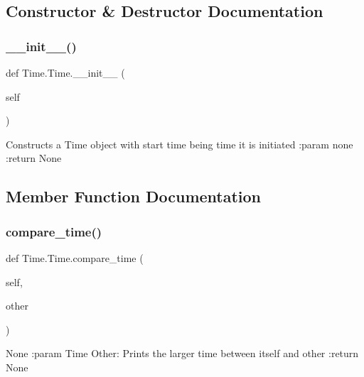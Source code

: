 \subsection{Constructor \& Destructor Documentation}
\mbox{\label{class_time_1_1_time_a2fcd7309de0e40d3550b6fd97c2551bc}} 
\subsubsection{\texorpdfstring{\+\_\+\+\_\+init\+\_\+\+\_\+()}{\_\_init\_\_()}}
{\footnotesize\ttfamily def Time.\+Time.\+\_\+\+\_\+init\+\_\+\+\_\+ (\begin{DoxyParamCaption}\item[{}]{self }\end{DoxyParamCaption})}

\begin{DoxyVerb}Constructs a Time object with start time being time it is initiated
:param none
:return None
\end{DoxyVerb}
 

\subsection{Member Function Documentation}
\mbox{\label{class_time_1_1_time_ae62071f9db0a182d0ccc85bfbf8b2ebc}} 
\subsubsection{\texorpdfstring{compare\+\_\+time()}{compare\_time()}}
{\footnotesize\ttfamily def Time.\+Time.\+compare\+\_\+time (\begin{DoxyParamCaption}\item[{}]{self,  }\item[{}]{other }\end{DoxyParamCaption})}

\begin{DoxyVerb}None
:param Time Other: Prints the larger time between itself and other
:return None
\end{DoxyVerb}
 \mbox{\label{class_time_1_1_time_aafb2c5f50e604069848cf5dea89a0594}} 
